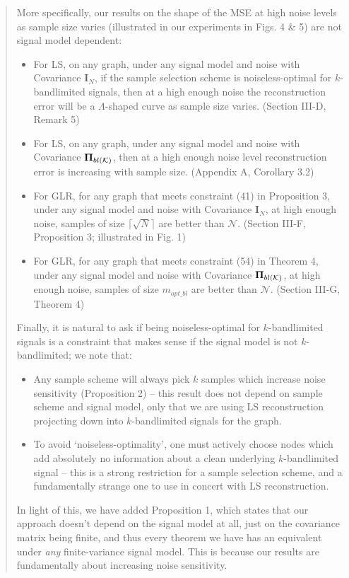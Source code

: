 \documentclass[11pt,onecolumn,journal]{IEEEtran}
\newcommand{\matr}[1]{\bm{#1}}
\theoremstyle{definition}
\newcommand{\set}[1]{\mathcal{#1}}
\begin{document}
\begin{quote}
More specifically, our results on the shape of the MSE at high noise levels as sample size varies (illustrated in our experiments in Figs. 4 \& 5) are not signal model dependent: 
\begin{itemize}
    \item For LS, on any graph, under any signal model and noise with Covariance $\matr{I}_{N}$, if the sample selection scheme is noiseless-optimal for $k$-bandlimited signals, then at a high enough noise the reconstruction error will be a $\Lambda$-shaped curve as sample size varies. (Section III-D, Remark 5)
    \item For LS, on any graph, under any signal model and noise with Covariance $\projbl$, then at a high enough noise level reconstruction error is increasing with sample size. (Appendix A, Corollary 3.2)
    \item For GLR, for any graph that meets constraint (41) in Proposition 3, under any signal model and noise with Covariance $\matr{I}_{N}$, at high enough noise, samples of size $\lceil\sqrt{N}\rceil$ are better than $\set{N}$. (Section III-F, Proposition 3; illustrated in Fig. 1)
    \item For GLR, for any graph that meets constraint (54) in Theorem 4, under any signal model and noise with Covariance $\projbl$, at high enough noise, samples of size $m_{opt\_bl}$ are better than $\set{N}$. (Section III-G, Theorem 4)
\end{itemize}

Finally, it is natural to ask if being noiseless-optimal for $k$-bandlimited signals is a constraint that makes sense if the signal model is not $k$-bandlimited; we note that:
\begin{itemize}
    \item Any sample scheme will always pick $k$ samples which increase noise sensitivity (Proposition 2) -- this result does not depend on sample scheme and signal model, only that we are using LS reconstruction projecting down into $k$-bandlimited signals for the graph.
    \item To avoid `noiseless-optimality', one must actively choose nodes which add absolutely no information about a clean underlying $k$-bandlimited signal -- this is a strong restriction for a sample selection scheme, and a fundamentally strange one to use in concert with LS reconstruction.
\end{itemize}

\iffalse
In light of this, we have added Proposition 1, which states that our approach doesn't depend on the signal model at all, just on the covariance matrix being finite, and thus every theorem we have has an equivalent under \emph{any} finite-variance signal model. This is because our results are fundamentally about increasing noise sensitivity. 



\end{quote}
\end{document}
